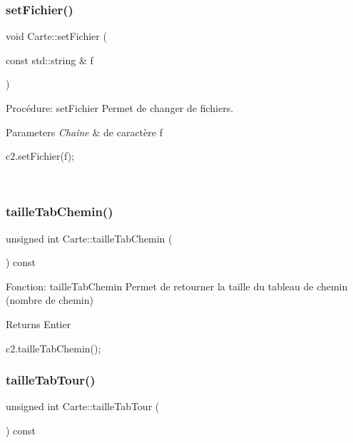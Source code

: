 \subsubsection{\texorpdfstring{set\+Fichier()}{setFichier()}}
{\footnotesize\ttfamily void Carte\+::set\+Fichier (\begin{DoxyParamCaption}\item[{const std\+::string \&}]{f }\end{DoxyParamCaption})}



Procédure\+: set\+Fichier Permet de changer de fichiers. 


\begin{DoxyParams}{Parameters}
{\em Chaîne} & de caractère f 
\begin{DoxyCode}
c2.setFichier(f);
\end{DoxyCode}
 \\
\hline
\end{DoxyParams}
\mbox{\label{classCarte_ab8f4fcaae33cf96d72eca6d819eb48c5}} 
\subsubsection{\texorpdfstring{taille\+Tab\+Chemin()}{tailleTabChemin()}}
{\footnotesize\ttfamily unsigned int Carte\+::taille\+Tab\+Chemin (\begin{DoxyParamCaption}{ }\end{DoxyParamCaption}) const}



Fonction\+: taille\+Tab\+Chemin Permet de retourner la taille du tableau de chemin (nombre de chemin) 

\begin{DoxyReturn}{Returns}
Entier 
\begin{DoxyCode}
c2.tailleTabChemin();
\end{DoxyCode}
 
\end{DoxyReturn}
\mbox{\label{classCarte_ab42ddff6b684b5d3e1942c4b637e41fd}} 
\subsubsection{\texorpdfstring{taille\+Tab\+Tour()}{tailleTabTour()}}
{\footnotesize\ttfamily unsigned int Carte\+::taille\+Tab\+Tour (\begin{DoxyParamCaption}{ }\end{DoxyParamCaption}) const}



